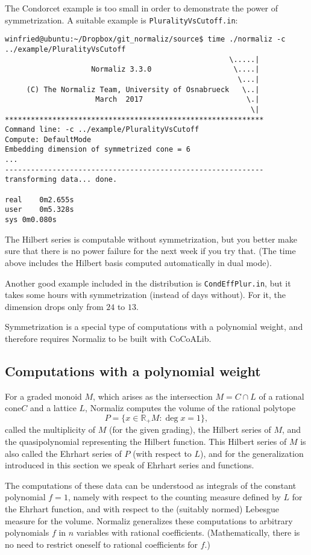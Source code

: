 \documentclass[12pt,a4paper]{scrartcl}
\theoremstyle{definition}
\def\RR{{\mathbb R}}
\begin{document}
The Condorcet example is too small in order to demonstrate the power of symmetrization. A suitable example is \verb|PluralityVsCutoff.in|:
\begin{Verbatim}
winfried@ubuntu:~/Dropbox/git_normaliz/source$ time ./normaliz -c ../example/PluralityVsCutoff
                                                    \.....|
                    Normaliz 3.3.0                   \....|
                                                      \...|
     (C) The Normaliz Team, University of Osnabrueck   \..|
                     March  2017                        \.|
                                                         \|
************************************************************
Command line: -c ../example/PluralityVsCutoff 
Compute: DefaultMode 
Embedding dimension of symmetrized cone = 6
...
------------------------------------------------------------
transforming data... done.

real	0m2.655s
user	0m5.328s
sys	0m0.080s
\end{Verbatim}
The Hilbert series is computable without symmetrization, but you better make sure that there is no power failure for the next week if you try that. (The time above includes the Hilbert basis computed automatically in dual mode).

Another good example included in the distribution is \verb|CondEffPlur.in|, but it takes some hours with symmetrization (instead of days without). For it, the dimension drops only from $24$ to $13$.

Symmetrization is a special type of computations with a polynomial weight, and therefore requires Normaliz to be built with CoCoALib.

\subsection{Computations with a polynomial weight}\label{Poly_comp}

For a graded monoid $M$, which arises as the intersection $M=C\cap L$ of a rational cone$C$ and a lattice $L$, Normaliz computes the volume of
the rational polytope
$$
P=\{x\in \RR_+ M: \deg x=1\},
$$
called the multiplicity of $M$ (for the given grading), the Hilbert series of $M$, and the quasipolynomial representing the Hilbert function. This Hilbert series of $M$ is also called the Ehrhart series of $P$ (with respect to $L$), and for the generalization introduced in this section we speak of Ehrhart series and functions.

The computations of these data can be understood as integrals of the
constant polynomial $f=1$, namely with respect to the counting
measure defined by $L$ for the Ehrhart function, and with
respect to the (suitably normed) Lebesgue measure for the
volume. Normaliz generalizes these computations to
arbitrary polynomials $f$ in $n$ variables with rational
coefficients. (Mathematically, there is no need to restrict
oneself to rational coefficients for $f$.)
\end{document}

